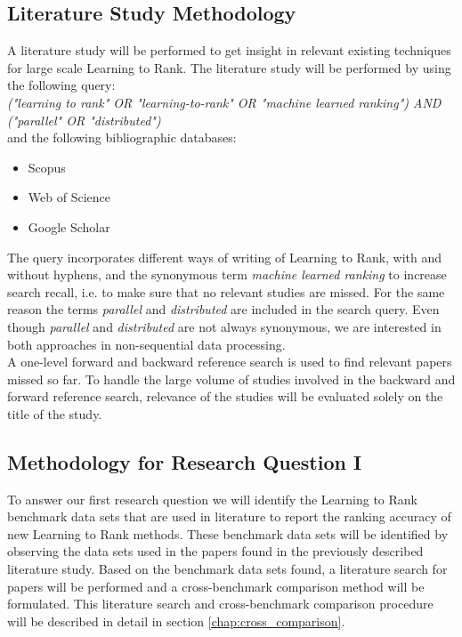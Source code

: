 \subsection{Literature Study Methodology}
A literature study will be performed to get insight in relevant existing techniques for large scale Learning to Rank. The literature study will be performed by using the following query:\\

\emph{("learning to rank" \emph{OR} "learning-to-rank" \emph{OR} "machine learned ranking") \emph{AND} ("parallel" \emph{OR} "distributed")}\\

and the following bibliographic databases:
\begin{itemize}
\item Scopus
\item Web of Science
\item Google Scholar
\end{itemize}

The query incorporates different ways of writing of Learning to Rank, with and without hyphens, and the synonymous term \emph{machine learned ranking} to increase search recall, i.e. to make sure that no relevant studies are missed. For the same reason the terms \emph{parallel} and \emph{distributed} are included in the search query. Even though \emph{parallel} and \emph{distributed} are not always synonymous, we are interested in both approaches in non-sequential data processing.\\

A one-level forward and backward reference search is used to find relevant papers missed so far. To handle the large volume of studies involved in the backward and forward reference search, relevance of the studies will be evaluated solely on the title of the study.

\subsection{Methodology for Research Question I}
To answer our first research question we will identify the Learning to Rank benchmark data sets that are used in literature to report the ranking accuracy of new Learning to Rank methods. These benchmark data sets will be identified by observing the data sets used in the papers found in the previously described literature study. Based on the benchmark data sets found, a literature search for papers will be performed and a cross-benchmark comparison method will be formulated. This literature search and cross-benchmark comparison procedure will be described in detail in section \ref{chap:cross_comparison}.

